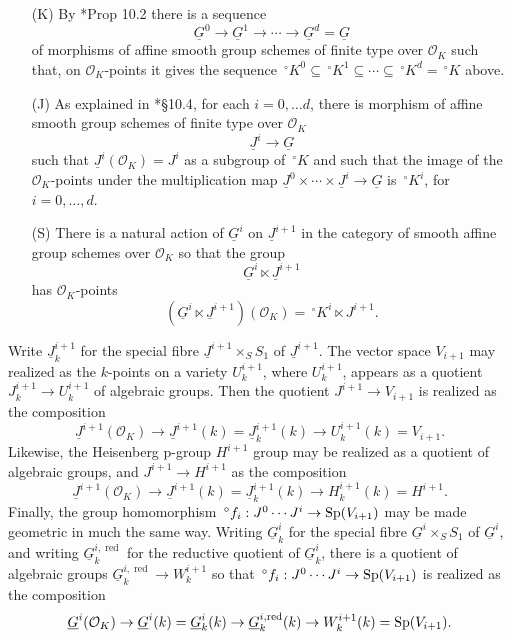 \documentclass[10pt]{amsart}
\theoremstyle{plain}
\theoremstyle{definition}
\newcommand{\OK}{\mathcal{O}_K}
\newcommand{\Fq}{k}
\begin{document}
\begin{enumerate}
\item[(K)]
By \cite{yu:models}*{Prop 10.2} there is a sequence  
\[
\underline{G}^0 \to \underline{G}^1 \to \cdots \to \underline{G}^d = \underline{G}
\]
of morphisms of affine smooth group schemes of finite type over $\OK$ such that, on $\OK$-points it gives the sequence $\,^\circ K^0 \subseteq \,^\circ K^1 \subseteq \cdots \subseteq \,^\circ K^d= \,^\circ K$ above.
\item[(J)]
As explained in \cite{yu:03a}*{\S 10.4}, for each $i=0,\ldots d$, there is morphism of affine smooth group schemes of finite type over $\OK$ 
\[
\underline{J}^i \to \underline{G}
\] 
such that $\underline{J}^i(\OK) = J^i$ as a subgroup of $\,^\circ K$ and such that the image of the $\OK$-points under the multiplication map $\underline{J}^0 \times \cdots \times \underline{J}^i \to \underline{G}$ is $\,^\circ K^i$, for $i=0, \ldots , d$.
\item[(S)]
There is a natural action of $\underline{G}^i$ on $\underline{J}^{i+1}$ in the category of smooth affine group schemes over $\OK$ so that the group
\[
\underline{G}^i \ltimes \underline{J}^{i+1}
\]
has $\OK$-points
\[
(\underline{G}^i \ltimes \underline{J}^{i+1})(\OK) = \,^\circ K^i \ltimes J^{i+1}.
\]
\end{enumerate}

\newcommand{\reductive}{{\operatorname{red}}}

Write $\underline{J}^{i+1}_\Fq$ for the special fibre $\underline{J}^{i+1}\times_S S_1$ of $\underline{J}^{i+1}$. 
The vector space $V_{i+1}$ may realized as the $\Fq$-points on a variety $U^{i+1}_\Fq$, where $U^{i+1}_\Fq$, appears as a quotient $J^{i+1}_\Fq \to U^{i+1}_\Fq$ of algebraic groups. Then the quotient $J^{i+1} \to V_{i+1}$ is realized as the composition
\[
\underline{J}^{i+1}(\OK) \to \underline{J}^{i+1}(\Fq) = \underline{J}^{i+1}_\Fq(\Fq) \to U^{i+1}_{\Fq}(\Fq) = V_{i+1}.
\]
Likewise, the Heisenberg p-group $H^{i+1}$ group may be realized as a quotient of algebraic groups, and $J^{i+1}\to H^{i+1}$ as the composition 
\[
\underline{J}^{i+1}(\OK) \to \underline{J}^{i+1}(\Fq) = \underline{J}^{i+1}_\Fq(\Fq) \to H^{i+1}_{\Fq}(\Fq) = H^{i+1}.
\]
Finally, the group homomorphism $\,^\circ f_i : J^0\cdots J^i \to {\operatorname{Sp}}(V_{i+1})$ may be made geometric in much the same way. 
Writing $\underline{G}^{i}_\Fq$ for the special fibre $\underline{G}^{i}\times_S S_1$ of $\underline{G}^{i}$, and writing $\underline{G}^{i,\reductive}_\Fq$ for the reductive quotient of $\underline{G}^{i}_\Fq$, there is a quotient of algebraic groups $\underline{G}^{i,\reductive}_\Fq \to W^{i+1}_\Fq$ so that $\,^\circ f_i : J^0\cdots J^i \to {\operatorname{Sp}}(V_{i+1})$ is realized as the composition
\[
\underline{G}^{i}(\OK) \to \underline{G}^{i}(\Fq) = \underline{G}^{i}_\Fq(\Fq) \to  \underline{G}^{i,\reductive}_\Fq(\Fq) \to W^{i+1}_{\Fq}(\Fq) = \Sp(V_{i+1}).
\]
\end{document}
